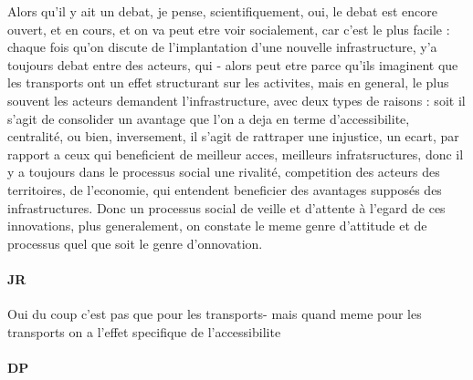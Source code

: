 \documentclass[12pt]{article}
\begin{document}
Alors qu'il y ait un debat, je pense, scientifiquement, oui, le debat est encore ouvert, et en cours, et on va peut etre voir socialement, car c'est le plus facile : chaque fois qu'on discute de l'implantation d'une nouvelle infrastructure, y'a toujours debat entre des acteurs, qui - alors peut etre parce qu'ils imaginent que les transports ont un effet structurant sur les activites, mais en general, le plus souvent les acteurs demandent l'infrastructure, avec deux types de raisons : soit il s'agit de consolider un avantage que l'on a deja en terme d'accessibilite, centralité, ou bien, inversement, il s'agit de rattraper une injustice, un ecart, par rapport a ceux qui beneficient de meilleur acces, meilleurs infratsructures, donc il y a toujours dans le processus social une rivalité, competition des acteurs des territoires, de l'economie, qui entendent beneficier des avantages supposés des infrastructures. Donc un processus social de veille et d'attente à l'egard de ces innovations, plus generalement, on constate le meme genre d'attitude et de processus quel que soit le genre d'onnovation. 

\paragraph{JR}

Oui du coup c'est pas que pour les transports- mais quand meme pour les transports on a l'effet specifique de l'accessibilite

\paragraph{DP}
\end{document}
